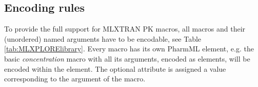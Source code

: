 
\subsection{Encoding rules}
\label{subsec:encodingRules}
To provide the full support for MLXTRAN PK macros, all macros and their (unordered) named 
arguments have to be encodable, see Table \ref{tab:MLXPLORElibrary}. Every macro has its own 
PharmML element, e.g. the basic \emph{concentration} macro with all its arguments, encoded as  
elements, will be encoded within the  element. The optional attribute 
is assigned a value corresponding to the argument of the macro. 


